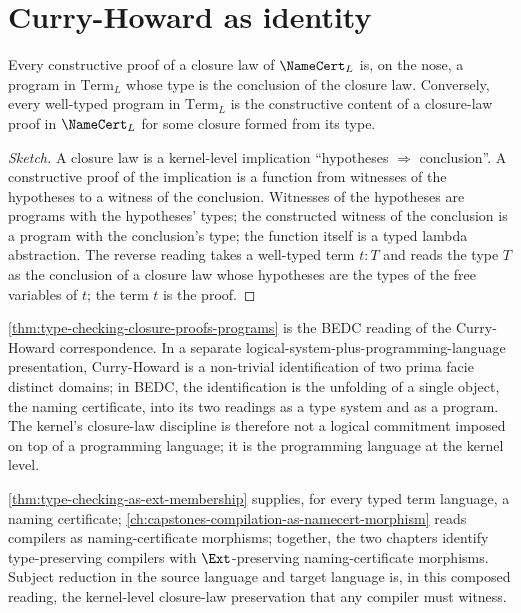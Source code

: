\section{Curry-Howard as identity}
\label{sec:type-checking-curry-howard}

\begin{theorem}
\label{thm:type-checking-closure-proofs-programs}
Every constructive proof of a closure law of $\NameCert_L$ is, on the nose, a program in $\mathrm{Term}_L$ whose type is the conclusion of the closure law. Conversely, every well-typed program in $\mathrm{Term}_L$ is the constructive content of a closure-law proof in $\NameCert_L$ for some closure formed from its type.
\end{theorem}

\begin{proof}[Sketch]
A closure law is a kernel-level implication ``hypotheses $\Rightarrow$ conclusion''. A constructive proof of the implication is a function from witnesses of the hypotheses to a witness of the conclusion. Witnesses of the hypotheses are programs with the hypotheses' types; the constructed witness of the conclusion is a program with the conclusion's type; the function itself is a typed lambda abstraction. The reverse reading takes a well-typed term $t \colon T$ and reads the type $T$ as the conclusion of a closure law whose hypotheses are the types of the free variables of $t$; the term $t$ is the proof.
\end{proof}

\begin{remark}
\label{rem:type-checking-curry-howard-built-in}
\autoref{thm:type-checking-closure-proofs-programs} is the BEDC reading of the Curry-Howard correspondence. In a separate logical-system-plus-programming-language presentation, Curry-Howard is a non-trivial identification of two prima facie distinct domains; in BEDC, the identification is the unfolding of a single object, the naming certificate, into its two readings as a type system and as a program. The kernel's closure-law discipline is therefore not a logical commitment imposed on top of a programming language; it is the programming language at the kernel level.
\end{remark}

\begin{remark}
\label{rem:type-checking-compilation-composition}
\autoref{thm:type-checking-as-ext-membership} supplies, for every typed term language, a naming certificate; \autoref{ch:capstones-compilation-as-namecert-morphism} reads compilers as naming-certificate morphisms; together, the two chapters identify type-preserving compilers with $\Ext$-preserving naming-certificate morphisms. Subject reduction in the source language and target language is, in this composed reading, the kernel-level closure-law preservation that any compiler must witness.
\end{remark}
